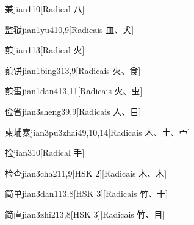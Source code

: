 \begin{entry}{兼}{jian1}{10}[Radical ⼋]
\end{entry}

\begin{entry}{监狱}{jian1yu4}{10,9}[Radicais ⽫、⽝]
\end{entry}

\begin{entry}{煎}{jian1}{13}[Radical ⽕]
\end{entry}

\begin{entry}{煎饼}{jian1bing3}{13,9}[Radicais ⽕、⾷]
\end{entry}

\begin{entry}{煎蛋}{jian1dan4}{13,11}[Radicais ⽕、⾍]
\end{entry}

\begin{entry}{俭省}{jian3sheng3}{9,9}[Radicais ⼈、⽬]
\end{entry}

\begin{entry}{柬埔寨}{jian3pu3zhai4}{9,10,14}[Radicais ⽊、⼟、⼧]
\end{entry}

\begin{entry}{捡}{jian3}{10}[Radical ⼿]
\end{entry}

\begin{entry}{检查}{jian3cha2}{11,9}[HSK 2][Radicais ⽊、⽊]
\end{entry}

\begin{entry}{简单}{jian3dan1}{13,8}[HSK 3][Radicais ⽵、⼗]
\end{entry}

\begin{entry}{简直}{jian3zhi2}{13,8}[HSK 3][Radicais ⽵、⽬]
\end{entry}

